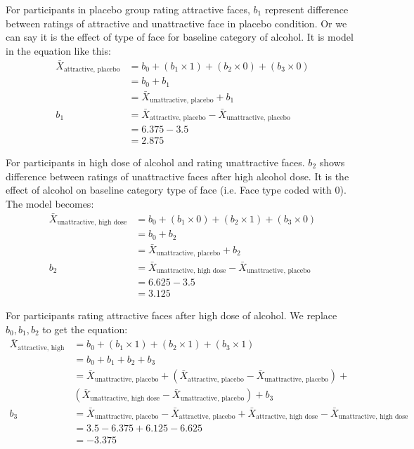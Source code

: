 For participants in placebo group rating attractive faces, $b_1$ represent difference between ratings of attractive and unattractive face in placebo condition. Or we can say it is the effect of type of face for baseline category of alcohol. It is model in the equation like this:
\begin{equation}
\begin{split}
\bar{X}_{\text{attractive, placebo}} & = b_0 + (b_1 \times 1) + (b_2 \times 0) + (b_3 \times 0) \\
& = b_0 + b_1 \\
& = \bar{X}_{\text{unattractive, placebo}} + b_1 \\
b_1 & = \bar{X}_{\text{attractive, placebo}} - \bar{X}_{\text{unattractive, placebo}} \\
& = 6.375 - 3.5\\
& = 2.875
\end{split}
\end{equation}
\clearpage

For participants in high dose of alcohol and rating unattractive faces. $b_2$ shows difference between ratings of unattractive faces after high alcohol dose. It is the effect of alcohol on baseline category type of face (i.e. Face type coded with 0). The model becomes:
\begin{equation}
\begin{split}
\bar{X}_{\text{unattractive, high dose}} & = b_0 + (b_1 \times 0) + (b_2 \times 1) + (b_3 \times 0) \\
& = b_0 + b_2 \\
& = \bar{X}_{\text{unattractive, placebo}} + b_2 \\
b_2 & = \bar{X}_{\text{unattractive, high dose}} - \bar{X}_{\text{unattractive, placebo}} \\
& = 6.625 - 3.5\\
& = 3.125
\end{split}
\end{equation}


For participants rating attractive faces after high dose of alcohol. We replace $b_0, b_1, b_2$ to get the equation:
\begin{equation}
\begin{split}
\bar{X}_{\text{attractive, high dose}} & = b_0 + (b_1 \times 1) + (b_2 \times 1) + (b_3 \times 1) \\
& = b_0 + b_1 + b_2 + b_3 \\
& = \bar{X}_{\text{unattractive, placebo}} + (\bar{X}_{\text{attractive, placebo}} - \bar{X}_{\text{unattractive, placebo}}) +  \\
 & (\bar{X}_{\text{unattractive, high dose}} - \bar{X}_{\text{unattractive, placebo}}) + b_3\\
b_3 & = \bar{X}_{\text{unattractive, placebo}} - \bar{X}_{\text{attractive, placebo}}  + \bar{X}_{\text{attractive, high dose}} - \bar{X}_{\text{unattractive, high dose}} \\
& = 3.5 - 6.375 + 6.125 - 6.625\\
& = -3.375
\end{split}
\end{equation}

